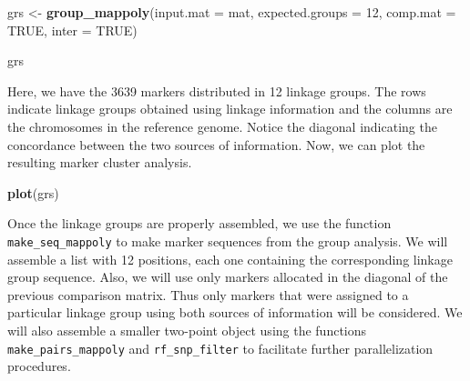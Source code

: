 \documentclass[
]{article}
\newenvironment{Shaded}{}{}
\newcommand{\DataTypeTok}[1]{\textcolor[rgb]{0.56,0.13,0.00}{#1}}
\newcommand{\DecValTok}[1]{\textcolor[rgb]{0.25,0.63,0.44}{#1}}
\newcommand{\KeywordTok}[1]{\textcolor[rgb]{0.00,0.44,0.13}{\textbf{#1}}}
\newcommand{\NormalTok}[1]{#1}
\newcommand{\OtherTok}[1]{\textcolor[rgb]{0.00,0.44,0.13}{#1}}
\newcommand{\StringTok}[1]{\textcolor[rgb]{0.25,0.44,0.63}{#1}}
\begin{document}
\begin{Shaded}
\begin{Highlighting}[]
\NormalTok{grs <-}\StringTok{ }\KeywordTok{group_mappoly}\NormalTok{(}\DataTypeTok{input.mat =}\NormalTok{ mat,}
                     \DataTypeTok{expected.groups =} \DecValTok{12}\NormalTok{,}
                     \DataTypeTok{comp.mat =} \OtherTok{TRUE}\NormalTok{, }
                     \DataTypeTok{inter =} \OtherTok{TRUE}\NormalTok{)}
\end{Highlighting}
\end{Shaded}

\begin{Shaded}
\begin{Highlighting}[]
\NormalTok{grs}
\end{Highlighting}
\end{Shaded}

Here, we have the 3639 markers distributed in 12 linkage groups. The
rows indicate linkage groups obtained using linkage information and the
columns are the chromosomes in the reference genome. Notice the diagonal
indicating the concordance between the two sources of information. Now,
we can plot the resulting marker cluster analysis.

\begin{Shaded}
\begin{Highlighting}[]
\KeywordTok{plot}\NormalTok{(grs)}
\end{Highlighting}
\end{Shaded}

Once the linkage groups are properly assembled, we use the function
\texttt{make\_seq\_mappoly} to make marker sequences from the group
analysis. We will assemble a list with 12 positions, each one containing
the corresponding linkage group sequence. Also, we will use only markers
allocated in the diagonal of the previous comparison matrix. Thus only
markers that were assigned to a particular linkage group using both
sources of information will be considered. We will also assemble a
smaller two-point object using the functions
\texttt{make\_pairs\_mappoly} and \texttt{rf\_snp\_filter} to facilitate
further parallelization procedures.
\end{document}
